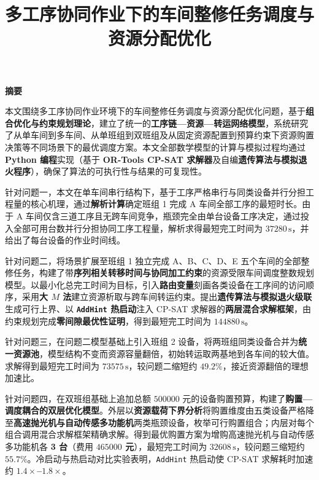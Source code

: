 \documentclass[12pt,a4paper]{ctexart}
\title{\zihao{3}\bfseries 多工序协同作业下的车间整修任务调度与资源分配优化}
\author{}
\date{}
\begin{document}
\maketitle

\begin{center}
\textbf{摘要}
\end{center}

本文围绕多工序协同作业环境下的车间整修任务调度与资源分配优化问题，基于\textbf{组合优化与约束规划理论}，建立了统一的\textbf{工序链—资源—转运网络模型}，系统研究了从单车间到多车间、从单班组到双班组及从固定资源配置到预算约束下资源购置决策等不同场景下的最优调度方案。本文全部数学模型的计算与模拟过程均通过 \textbf{Python 编程}实现（基于 \textbf{OR-Tools CP-SAT 求解器}及自编\textbf{遗传算法与模拟退火程序}），确保了算法的可执行性与结果的可复现性。

针对问题一，本文在单车间串行结构下，基于工序严格串行与同类设备并行分担工程量的核心机理，通过\textbf{解析计算}确定班组 1 完成 A 车间全部工序的最短时长。由于 A 车间仅含三道工序且无跨车间竞争，瓶颈完全由单台设备工序决定，通过投入全部可用台数并行分担协同工序工程量，解析求得最短完工时间为 \textbf{$37280\,\mathrm{s}$}，并给出了每台设备的作业时间线。

针对问题二，将场景扩展至班组 1 独立完成 A、B、C、D、E 五个车间的全部整修任务，构建了带\textbf{序列相关转移时间与协同加工约束}的资源受限车间调度整数规划模型。以最小化总完工时间为目标，引入\textbf{路由变量}刻画各类设备在工序间的访问顺序，采用\textbf{大 $M$ 法}建立资源析取与跨车间转运约束。提出\textbf{遗传算法与模拟退火级联}生成可行上界\cite{shi2026}、以 \textbf{\texttt{AddHint} 热启动}注入 CP-SAT 求解器的\textbf{两层混合求解框架}，由约束规划完成\textbf{零间隙最优性证明}，得到最短完工时间为 \textbf{$144880\,\mathrm{s}$}。

针对问题三，在问题二模型基础上引入班组 2 设备，将两班组同类设备合并为\textbf{统一资源池}，模型结构不变而资源容量翻倍，初始转运取两基地到各车间的较大值。求解得到最短完工时间为 \textbf{$73575\,\mathrm{s}$}，较问题二缩短约 \textbf{$49.2\%$}，接近资源翻倍的理想加速比。

针对问题四，在双班组基础上追加总额 $500000$ 元的设备购置预算，构建了\textbf{购置—调度耦合的双层优化模型}。外层以\textbf{资源载荷下界分析}将购置维度由五类设备严格降至\textbf{高速抛光机与自动传感多功能机}两类瓶颈设备，枚举可行购置组合；内层对每个组合调用混合求解框架精确求解。得到最优购置方案为增购高速抛光机与自动传感多功能机各 \textbf{3 台}（费用 \textbf{$465000$ 元}），最短完工时间为 \textbf{$32608\,\mathrm{s}$}，较问题三缩短约 \textbf{$55.7\%$}。冷启动与热启动对比实验表明，\texttt{AddHint} 热启动使 CP-SAT 求解耗时加速约 \textbf{$1.4\times$--$1.8\times$}。
\end{document}
